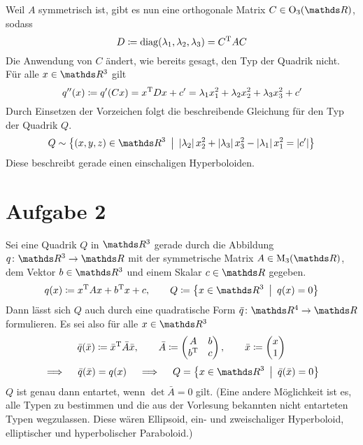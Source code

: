 		Weil $A$ symmetrisch ist, gibt es nun eine orthogonale Matrix $C\in\m{O}_3(\SR)$, sodass
		\[ D \coloneqq \operatorname{diag}(\lambda_1,\lambda_2,\lambda_3) = {C}^{\mathrm{T}}AC \]
		Die Anwendung von $C$ ändert, wie bereits gesagt, den Typ der Quadrik nicht.
		Für alle $x\in\SR^3$ gilt
		\[ q^{\prime\prime}(x) \coloneqq q^\prime(Cx) = {x}^{\mathrm{T}}Dx + c^\prime = \lambda_1x_1^2 + \lambda_2x_2^2 + \lambda_3x_3^2 + c^\prime \]
		Durch Einsetzen der Vorzeichen folgt die beschreibende Gleichung für den Typ der Quadrik $Q$.
		\[ Q\sim\set{(x,y,z)\in\SR^3}{ \abs{\lambda_2}x_2^2 + \abs{\lambda_3}x_3^2 - \abs{\lambda_1}x_1^2 = \abs{c^\prime} } \]
		Diese beschreibt gerade einen einschaligen Hyperboloiden.
		

	\section*{Aufgabe 2} %
	\label{sec:aufgabe_2}
	
		Sei eine Quadrik $Q$ in $\SR^3$ gerade durch die Abbildung $\func{q}{\SR^3}{\SR}$ mit der symmetrische Matrix $A\in\m{M}_3(\SR)$, dem Vektor $b\in\SR^3$ und einem Skalar $c\in\SR$ gegeben.
		\[ q(x) \define \transp{x}Ax + \transp{b}x + c, \qquad Q \define \set{x\in\SR^3}{q(x)=0} \]
		Dann lässt sich $Q$ auch durch eine quadratische Form $\func{\bar{q}}{\SR^4}{\SR}$ formulieren.
		Es sei also für alle $x\in\SR^3$
		\[
			\bar{q}(\bar{x}) \coloneqq {\bar{x}}^{\mathrm{T}}\bar{A}\bar{x},\qquad \bar{A} \coloneqq
			\begin{pmatrix}
				A & b \\
				{b}^{\mathrm{T}} & c
			\end{pmatrix}
			,\qquad \bar{x} \coloneqq
			\begin{pmatrix}
				x \\ 1
			\end{pmatrix}
		\]
		\[ \implies \quad \bar{q}(\bar{x}) = q(x) \quad \implies \quad Q = \set{x\in\SR^3}{\bar{q}(\bar{x}) = 0} \]
		$Q$ ist genau dann entartet, wenn $\det \bar{A} = 0$ gilt.
		(Eine andere Möglichkeit ist es, alle Typen zu bestimmen und die aus der Vorlesung bekannten nicht entarteten Typen wegzulassen.
		Diese wären Ellipsoid, ein- und zweischaliger Hyperboloid, elliptischer und hyperbolischer Paraboloid.)

